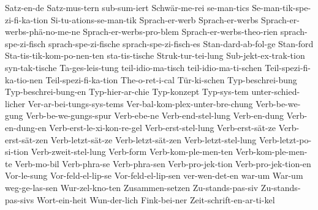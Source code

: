 {Satz-en-de
Satz-mus-tern
             sub-sum-iert
Schwär-me-rei
se-man-tics
Se-man-tik-spe-zi-fi-ka-tion
	     Si-tu-ations-se-man-tik
Sprach-er-werb
Sprach-er-werbs
Sprach-er-werbs-phä-no-me-ne
Sprach-er-werbs-pro-blem
Sprach-er-werbs-theo-rien
sprach-spe-zi-fisch
sprach-spe-zi-fische
sprach-spe-zi-fisch-es
             Stan-dard-ab-fol-ge
Stan-ford
Sta-tis-tik-kom-po-nen-ten
sta-tis-tische
Struk-tur-tei-lung
Sub-jekt-ex-trak-tion
             syn-tak-tische
Ta-ges-leis-tung
teil-idio-ma-tisch
teil-idio-ma-ti-schen
             Teil-spezi-fi-ka-tio-nen
             Teil-spezi-fi-ka-tion
The-o-ret-i-cal
Tür-ki-schen
             Typ-beschrei-bung
             Typ-beschrei-bung-en
             Typ-hier-ar-chie
             Typ-konzept
             Typ-sys-tem
	     unter-schied-licher
Ver-ar-bei-tungs-sys-tems
             Ver-bal-kom-plex-unter-bre-chung
Verb-be-we-gung
Verb-be-we-gungs-spur
Verb-ebe-ne
             Verb-end-stel-lung
             Verb-en-dung
             Verb-en-dung-en
Verb-erst-le-xi-kon-re-gel
	     Verb-erst-stel-lung
Verb-erst-sät-ze
Verb-erst-sät-zen
Verb-letzt-sät-ze
Verb-letzt-sät-zen
Verb-letzt-stel-lung
Verb-letzt-po-si-tion
	     Verb-zweit-stel-lung
             Verb-form
             Verb-kom-ple-men-ten
             Verb-kom-ple-men-te
Verb-mo-bil
             Verb-phra-se
             Verb-phra-sen
Verb-pro-jek-tion
Verb-pro-jek-tion-en
             Vor-le-sung
             Vor-feld-el-lip-se
             Vor-feld-el-lip-sen
	     ver-wen-det-en
             war-um
             War-um
weg-ge-las-sen
             Wur-zel-kno-ten
             Zusammen-setzen
             Zu-stands-pas-siv
             Zu-stands-pas-sivs
Wort-ein-heit
Wun-der-lich
Fink-bei-ner
Zeit-schrift-en-ar-ti-kel
}